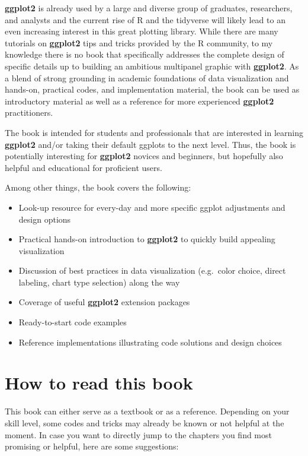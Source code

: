 \documentclass[
]{krantz}
\providecommand{\tightlist}{%
  \setlength{\itemsep}{0pt}\setlength{\parskip}{0pt}}
\begin{document}
\textbf{ggplot2} is already used by a large and diverse group of graduates, researchers, and analysts and the current rise of R and the tidyverse will likely lead to an even increasing interest in this great plotting library. While there are many tutorials on \textbf{ggplot2} tips and tricks provided by the R community, to my knowledge there is no book that specifically addresses the complete design of specific details up to building an ambitious multipanel graphic with \textbf{ggplot2}. As a blend of strong grounding in academic foundations of data visualization and hands-on, practical codes, and implementation material, the book can be used as introductory material as well as a reference for more experienced \textbf{ggplot2} practitioners.

The book is intended for students and professionals that are interested in learning \textbf{ggplot2} and/or taking their default ggplots to the next level. Thus, the book is potentially interesting for \textbf{ggplot2} novices and beginners, but hopefully also helpful and educational for proficient users.

Among other things, the book covers the following:

\begin{itemize}
\tightlist
\item
  Look-up resource for every-day and more specific ggplot adjustments and design options
\item
  Practical hands-on introduction to \textbf{ggplot2} to quickly build appealing visualization
\item
  Discussion of best practices in data visualization (e.g.~color choice, direct labeling, chart type selection) along the way
\item
  Coverage of useful \textbf{ggplot2} extension packages
\item
  Ready-to-start code examples
\item
  Reference implementations illustrating code solutions and design choices
\end{itemize}

\hypertarget{how-to-read-this-book}{%
\section*{How to read this book}\label{how-to-read-this-book}}


This book can either serve as a textbook or as a reference. Depending on your skill level, some codes and tricks may already be known or not helpful at the moment. In case you want to directly jump to the chapters you find most promising or helpful, here are some suggestions:
\end{document}
